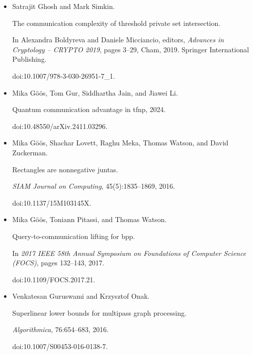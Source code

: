 \documentclass[10pt,a4paper]{article}
\begin{document}
\begin{itemize}
\item[] 
[27]

Satrajit Ghosh and Mark Simkin.


The communication complexity of threshold private set intersection.


In Alexandra Boldyreva and Daniele Micciancio, editors, \emph{Advances
in Cryptology – CRYPTO 2019}, pages 3–29, Cham, 2019. Springer
International Publishing.


doi:10.1007/978-3-030-26951-7\_1.





\item[] 
[28]

Mika Göös, Tom Gur, Siddhartha Jain, and Jiawei Li.


Quantum communication advantage in tfnp, 2024.


doi:10.48550/arXiv.2411.03296.





\item[] 
[29]

Mika Göös, Shachar Lovett, Raghu Meka, Thomas Watson, and David
Zuckerman.


Rectangles are nonnegative juntas.


\emph{SIAM Journal on Computing}, 45(5):1835–1869, 2016.


doi:10.1137/15M103145X.





\item[] 
[30]

Mika Göös, Toniann Pitassi, and Thomas Watson.


Query-to-communication lifting for bpp.


In \emph{2017 IEEE 58th Annual Symposium on Foundations of Computer
Science (FOCS)}, pages 132–143, 2017.


doi:10.1109/FOCS.2017.21.





\item[] 
[31]

Venkatesan Guruswami and Krzysztof Onak.


Superlinear lower bounds for multipass graph processing.


\emph{Algorithmica}, 76:654–683, 2016.


doi:10.1007/S00453-016-0138-7.






\end{itemize}
\end{document}
